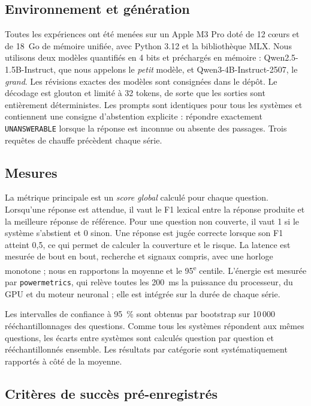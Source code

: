 \documentclass[11pt,a4paper]{article}
\begin{document}
\subsection{Environnement et génération}

Toutes les expériences ont été menées sur un Apple M3 Pro doté de 12 cœurs et de 18~Go de mémoire
unifiée, avec Python 3.12 et la bibliothèque MLX. Nous utilisons deux modèles quantifiés en 4 bits et
préchargés en mémoire : Qwen2.5-1.5B-Instruct, que nous appelons le \emph{petit} modèle, et
Qwen3-4B-Instruct-2507, le \emph{grand}. Les révisions exactes des modèles sont consignées dans le dépôt.
Le décodage est glouton et limité à 32 tokens, de sorte que les sorties sont entièrement déterministes.
Les prompts sont identiques pour tous les systèmes et
contiennent une consigne d'abstention explicite : répondre exactement \texttt{UNANSWERABLE} lorsque la
réponse est inconnue ou absente des passages. Trois requêtes de chauffe précèdent chaque série.

\subsection{Mesures}

La métrique principale est un \emph{score global} calculé pour chaque question. Lorsqu'une réponse est
attendue, il vaut le F1 lexical entre la réponse produite et la meilleure réponse de référence. Pour une
question non couverte, il vaut 1 si le système s'abstient et 0 sinon. Une réponse est jugée correcte
lorsque son F1 atteint 0,5, ce qui permet de calculer la couverture et le risque. La latence est mesurée
de bout en bout, recherche et signaux compris, avec une horloge monotone ; nous en rapportons la moyenne
et le 95\textsuperscript{e} centile. L'énergie est mesurée par \texttt{powermetrics}, qui relève toutes
les 200~ms la puissance du processeur, du GPU et du moteur neuronal ; elle est intégrée sur la durée de
chaque série.

Les intervalles de confiance à 95~\% sont obtenus par bootstrap sur 10\,000 rééchantillonnages des
questions. Comme tous les systèmes répondent aux mêmes questions, les écarts entre systèmes sont
calculés question par question et rééchantillonnés ensemble. Les résultats par catégorie sont
systématiquement rapportés à côté de la moyenne.

\subsection{Critères de succès pré-enregistrés}
\end{document}
